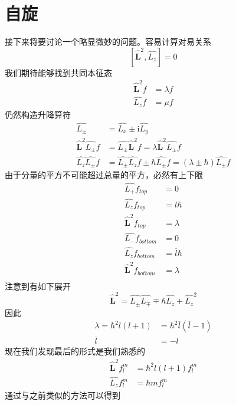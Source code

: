\documentclass[12pt, a4paper, oneside]{ctexart}
\begin{document}
	\section{自旋}
	接下来将要讨论一个略显微妙的问题。容易计算对易关系
	\begin{equation}
		\left[\boldsymbol{\hat{L}}^{2},\hat{L_{z}}\right]=0
	\end{equation}
	\quad\quad 我们期待能够找到共同本征态
	\begin{align}
		\boldsymbol{\hat{L}}^{2}f&=\lambda f\\
		\hat{L_{z}}f&=\mu f
	\end{align}
	\quad\quad 仍然构造升降算符
	\begin{align}
		\hat{L_{\pm}}&=\hat{L_{x}}\pm\mathrm{i}\hat{L_{y}}\\
		\boldsymbol{\hat{L}}^{2}\hat{L_{\pm}}f&=\hat{L_{\pm}}\boldsymbol{\hat{L}}^{2}f=\lambda\boldsymbol{\hat{L}}^{2}\hat{L_{\pm}}f\\
		\hat{L_{z}}\hat{L_{\pm}}f&=\hat{L_{\pm}}\hat{L_{z}}f\pm\hbar\hat{L_{\pm}}f=(\lambda\pm\hbar)\hat{L_{\pm}}f
	\end{align}
	\quad\quad 由于分量的平方不可能超过总量的平方，必然有上下限
	\begin{align}
		\hat{L_{+}}f_{top}&=0\\
		\hat{L_{z}}f_{top}&=l\hbar\\
		\boldsymbol{\hat{L}}^{2}f_{top}&=\lambda\\
		\hat{L_{-}}f_{bottom}&=0\\
		\hat{L_{z}}f_{bottom}&=\overline{l}\hbar\\
		\boldsymbol{\hat{L}}^{2}f_{bottom}&=\lambda\\
	\end{align}
	\quad\quad 注意到有如下展开
	\begin{equation}
		\boldsymbol{\hat{L}}^{2}=\hat{L_{\pm}}\hat{L_{\mp}}\mp\hbar\hat{L_{z}}+\hat{L_{z}}^{2}
	\end{equation}
	\quad\quad 因此
	\begin{align}
		\lambda=\hbar^{2}l(l+1)&=\hbar^{2}\overline{l}(\overline{l}-1)\\
		\overline{l}&=-l
	\end{align}
	\quad\quad 现在我们发现最后的形式是我们熟悉的
	\begin{align}
		\boldsymbol{\hat{L}}^{2}f^{m}_{l}&=\hbar^{2}l(l+1) f^{m}_{l}\\
		\hat{L_{z}}f^{m}_{l}&=\hbar mf^{m}_{l}
	\end{align}
	\quad\quad 通过与之前类似的方法可以得到
\end{document}
